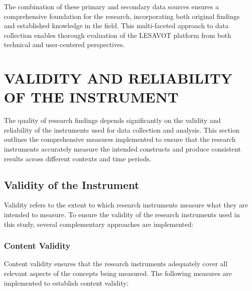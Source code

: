 \documentclass[12pt, a4paper, oneside]{book}
\begin{document}
The combination of these primary and secondary data sources ensures a comprehensive foundation for the research, incorporating both original findings and established knowledge in the field. This multi-faceted approach to data collection enables thorough evaluation of the LESAVOT platform from both technical and user-centered perspectives.

\section{VALIDITY AND RELIABILITY OF THE INSTRUMENT}

The quality of research findings depends significantly on the validity and reliability of the instruments used for data collection and analysis. This section outlines the comprehensive measures implemented to ensure that the research instruments accurately measure the intended constructs and produce consistent results across different contexts and time periods.

\subsection{Validity of the Instrument}

Validity refers to the extent to which research instruments measure what they are intended to measure. To ensure the validity of the research instruments used in this study, several complementary approaches are implemented:

\subsubsection{Content Validity}
Content validity ensures that the research instruments adequately cover all relevant aspects of the concepts being measured. The following measures are implemented to establish content validity:
\end{document}
